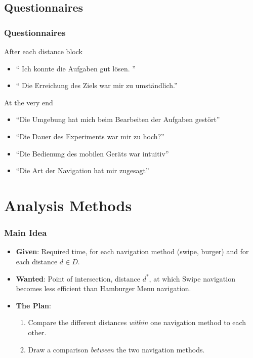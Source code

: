 \documentclass{beamer}
\begin{document}
\subsection{Questionnaires}
\begin{frame}
        \frametitle{Questionnaires}
        \begin{block}{After each distance block}
                \begin{itemize}
                        \item `` Ich konnte die Aufgaben gut lösen. ''
                        \item `` Die Erreichung des Ziels war mir zu umständlich.''
                \end{itemize}
        \end{block}
        \begin{block}{At the very end}
                \begin{itemize}
                        \item ``Die Umgebung hat mich beim Bearbeiten der Aufgaben gestört''
                        \item ``Die Dauer des Experiments war mir zu hoch?''
                        \item ``Die Bedienung des mobilen Geräts war intuitiv''
                        \item ``Die Art der Navigation hat mir zugesagt''
                \end{itemize}
        \end{block}
\end{frame}

\section{Analysis Methods}
\begin{frame}
  \frametitle{Main Idea}
  \begin{itemize}
    \item \textbf{Given}:
      Required time, for each navigation method (swipe, burger) and for each
      distance $d \in D$.
    \item \textbf{Wanted}: Point of intersection, distance  $d^*$, at which Swipe
      navigation becomes less efficient than Hamburger Menu navigation.
    \item \textbf{The Plan}:
      \begin{enumerate}
        \item Compare the different distances \emph{within} one navigation
          method to each other.
        \item Draw a comparison \emph{between} the two
          navigation methods.
      \end{enumerate}
  \end{itemize}
\end{frame}
\end{document}
